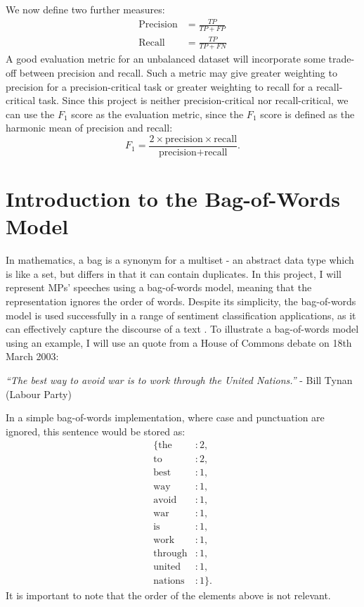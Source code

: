 \documentclass[12pt,a4paper,twoside,openright]{report}
\begin{document}
\newline
We now define two further measures:
\begin{align}
	\text{Precision} & = \frac{TP}{TP + FP} \\
	\text{Recall} & = \frac{TP}{TP + FN}
\end{align}
A good evaluation metric for an unbalanced dataset will incorporate some trade-off between precision and recall. Such a metric may give greater weighting to precision for a precision-critical task or greater weighting to recall for a recall-critical task. Since this project is neither precision-critical nor recall-critical, we can use the $F_1$ score as the evaluation metric, since the $F_1$ score is defined as the harmonic mean of precision and recall:
\begin{equation}
	F_1 = \frac{2 \times \text{precision} \times \text{recall}}{\text{precision} + \text{recall}}.
\end{equation}
\section{Introduction to the Bag-of-Words Model} \label{prep-bow}

In mathematics, a bag is a synonym for a multiset - an abstract data type which is like a set, but differs in that it can contain duplicates. In this project, I will represent MPs' speeches using a bag-of-words model, meaning that the representation ignores the order of words. Despite its simplicity, the bag-of-words model is used successfully in a range of sentiment classification applications, as it can effectively capture the discourse of a text \cite{nlp_book}.
\newline
\newline
To illustrate a bag-of-words model using an example, I will use an quote from a House of Commons debate on 18th March 2003:
\begin{center}
	\textit{``The best way to avoid war is to work through the United Nations.''}
	\newline
	 - Bill Tynan (Labour Party)
\end{center}
In a simple bag-of-words implementation, where case and punctuation are ignored, this sentence would be stored as:
\begin{align*}
	\{\text{the}&: 2,\\ \text{to}&: 2,\\ \text{best}&: 1,\\ \text{way}&: 1,\\ \text{avoid}&: 1,\\ \text{war}&: 1,\\ \text{is}&: 1,\\ \text{work}&: 1,\\ \text{through}&: 1,\\ \text{united}&: 1,\\ \text{nations}&: 1\}.
\end{align*}
It is important to note that the order of the elements above is not relevant.
\end{document}
